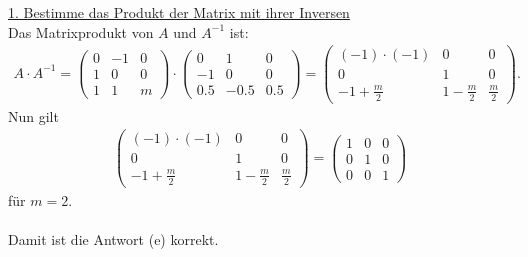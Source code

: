 \underline{1. Bestimme das Produkt der Matrix mit ihrer Inversen}\\
Das Matrixprodukt von $ A $ und $ A^{-1} $ ist:
\begin{align*}
	A \cdot A^{-1}
	=
	\begin{pmatrix}
		0 & -1 & 0 \\
		1 & 0 & 0 \\
		1 & 1 & m
	\end{pmatrix}
	\cdot
	\begin{pmatrix}
		0 & 1 & 0 \\
		-1 & 0 & 0 \\
		0.5 & -0.5 &0.5
	\end{pmatrix}
	=
	\begin{pmatrix}
		(-1) \cdot (-1) & 0 & 0\\
		0 & 1 & 0\\
		-1 + \frac{m}{2} & 1 - \frac{m}{2} & \frac{m}{2}
	\end{pmatrix}.
\end{align*}
Nun gilt 
\begin{align*}
	\begin{pmatrix}
		(-1) \cdot (-1) & 0 & 0\\
		0 & 1 & 0\\
		-1 + \frac{m}{2} & 1 - \frac{m}{2} & \frac{m}{2}
	\end{pmatrix}
	=
	\begin{pmatrix}
		1 & 0 & 0 \\
		0 & 1 & 0 \\
		0 & 0 & 1
	\end{pmatrix}
\end{align*}
für $ m = 2 $.\\
\\
Damit ist die Antwort (e) korrekt.






\newpage



